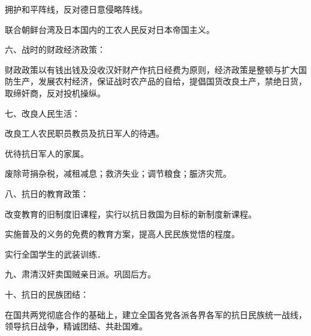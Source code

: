 拥护和平阵线，反对德日意侵略阵线。

联合朝鲜台湾及日本国内的工农人民反对日本帝国主义。

六、战时的财政经济政策：

财政政策以有钱出钱及没收汉奸财产作抗日经费为原则，经济政策是整顿与扩大国防生产，发展农村经济，保证战时农产品的自给，提倡国货改良土产，禁绝日货，取缔奸商，反对投机操纵。


七、改良人民生活：

改良工人农民职员教员及抗日军人的待遇。


优待抗日军人的家属。

废除苛捐杂税，减租减息；救济失业；调节粮食；脤济灾荒。

八、抗日的教育政策：

改变教育的旧制度旧课程，实行以抗日救国为目标的新制度新课程。

实施普及的义务的免费的教育方案，提高人民民族觉悟的程度。

实行全国学生的武装训练．

九、肃清汉奸卖国贼亲日派。巩固后方。

十、抗日的民族团结：

在国共两党彻底合作的基础上，建立全国各党各派各界各军的抗日民族统一战线，领导抗日战争，精诚团结、共赴国难。

